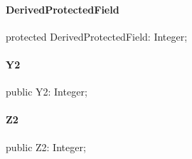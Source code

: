 \documentclass{report}
\begin{document}
\paragraph*{DerivedProtectedField}\hspace*{\fill}

\begin{list}{}{
\setlength{\itemindent}{0cm}
\setlength{\listparindent}{0cm}
\setlength{\leftmargin}{\evensidemargin}
\addtolength{\leftmargin}{\tmplength}
\settowidth{\labelsep}{X}
\addtolength{\leftmargin}{\labelsep}
\setlength{\labelwidth}{\tmplength}
}
\begin{flushleft}
\item[\textbf{Declaration}\hfill]
\begin{ttfamily}
protected DerivedProtectedField: Integer;\end{ttfamily}


\end{flushleft}
\end{list}
\paragraph*{Y2}\hspace*{\fill}

\begin{list}{}{
\setlength{\itemindent}{0cm}
\setlength{\listparindent}{0cm}
\setlength{\leftmargin}{\evensidemargin}
\addtolength{\leftmargin}{\tmplength}
\settowidth{\labelsep}{X}
\addtolength{\leftmargin}{\labelsep}
\setlength{\labelwidth}{\tmplength}
}
\begin{flushleft}
\item[\textbf{Declaration}\hfill]
\begin{ttfamily}
public Y2: Integer;\end{ttfamily}


\end{flushleft}
\end{list}
\paragraph*{Z2}\hspace*{\fill}

\begin{list}{}{
\setlength{\itemindent}{0cm}
\setlength{\listparindent}{0cm}
\setlength{\leftmargin}{\evensidemargin}
\addtolength{\leftmargin}{\tmplength}
\settowidth{\labelsep}{X}
\addtolength{\leftmargin}{\labelsep}
\setlength{\labelwidth}{\tmplength}
}
\begin{flushleft}
\item[\textbf{Declaration}\hfill]
\begin{ttfamily}
public Z2: Integer;\end{ttfamily}


\end{flushleft}
\end{list}
\end{document}
